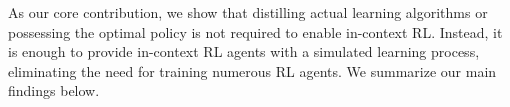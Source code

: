 \documentclass{article}
\theoremstyle{plain}
\theoremstyle{definition}
\theoremstyle{remark}
\begin{document}
As our core contribution, we show that distilling actual learning algorithms or possessing the optimal policy is not required to enable in-context RL. Instead, it is enough to provide in-context RL agents with a simulated learning process, eliminating the need for training numerous RL agents. We summarize our main findings below.




\end{document}
